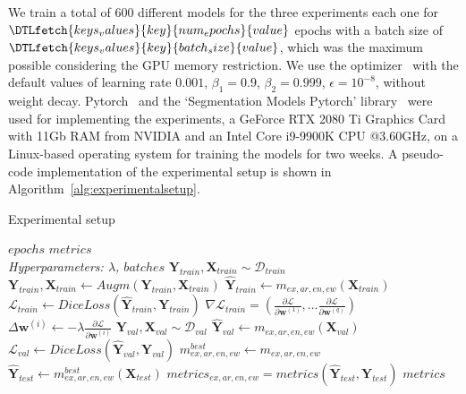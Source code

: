 \documentclass{elsarticle}
\begin{document}
We train a total of $600$ different models for the three experiments each one for $\DTLfetch{keys_values}{key}{num_epochs}{value}$ epochs with a batch size of $\DTLfetch{keys_values}{key}{batch_size}{value}$, which was the maximum possible considering the GPU memory restriction.
We use the optimizer~\cite{kingma2014adam} with the default values of learning rate $0.001$, $\beta_1=0.9$, $\beta_2=0.999$, $\epsilon=10^{-8}$, without weight decay.
Pytorch~\cite{paszke2019pytorch} and the `Segmentation Models Pytorch' library~\cite{yakubovskiy2019segmentation} were used for implementing the experiments, a GeForce RTX 2080 Ti Graphics Card with 11Gb RAM from NVIDIA and an Intel Core i9-9900K CPU @3.60GHz, on a Linux-based operating system for training the models for two weeks.
A pseudo-code implementation of the experimental setup is shown in Algorithm~\ref{alg:experimentalsetup}.

\begin{algorithm}[H]
	\caption{Experimental setup}
	\label{alg:experimentalsetup}
	\begin{algorithmic}[1]
		\renewcommand{\algorithmicrequire}{\textbf{Input:}}
		\renewcommand{\algorithmicensure}{\textbf{Output:}}
		\REQUIRE $epochs$
		\ENSURE $metrics$
		\\ \textit{Hyperparameters:  $\lambda$, $batches$}
		\STATE $\bm{Y}_{train}, \bm{X}_{train} \sim \mathcal{D}_{train}$
		\STATE $\bm{Y}_{train}, \bm{X}_{train} \leftarrow Augm(\bm{Y}_{train}, \bm{X}_{train})$
		\STATE $\hat{\bm{Y}}_{train} \leftarrow m_{ex, ar, en, ew}(\bm{X}_{train})$
		\STATE $\mathcal{L}_{train} \leftarrow DiceLoss(\hat{\bm{Y}}_{train}, \bm{Y}_{train})$
		\STATE $\nabla\mathcal{L}_{train} = \left( \frac{\partial\mathcal{L}}{\partial\bm{w}^{(1)}},\ldots\frac{\partial\mathcal{L}}{\partial\bm{w}^{(q)}}\right)$
		\STATE $\Delta\bm{w}^{(i)} \leftarrow -\lambda\frac{\partial\mathcal{L}}{\partial\bm{w}^{(i)}}$
		\ENDFOR
		\STATE $\bm{Y}_{val}, \bm{X}_{val} \sim \mathcal{D}_{val}$
		\STATE $\hat{\bm{Y}}_{val} \leftarrow m_{ex, ar, en, ew}(\bm{X}_{val})$
		\STATE $\mathcal{L}_{val} \leftarrow DiceLoss(\hat{\bm{Y}}_{val}, \bm{Y}_{val})$
		\ENDFOR
		\STATE $m_{ex, ar, en, ew}^{best} \leftarrow m_{ex, ar, en, ew}$
		\ENDIF
		\ENDFOR
		\STATE $\hat{\bm{Y}}_{test} \leftarrow m_{ex, ar, en, ew}^{best}(\bm{X}_{test})$
		\STATE $metrics_{ex, ar, en, ew} = metrics(\hat{\bm{Y}}_{test}, \bm{Y}_{test})$
		\ENDFOR
		\ENDFOR
		\ENDFOR
		\ENDFOR
		\RETURN $metrics$
	\end{algorithmic}
\end{algorithm}
\end{document}

